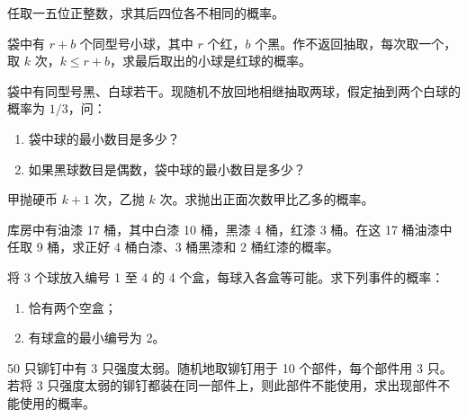 \begin{exercise}
任取一五位正整数，求其后四位各不相同的概率。
\end{exercise}

\begin{exercise}
袋中有 $r+b$ 个同型号小球，其中 $r$ 个红，$b$ 个黑。作不返回抽取，每次取一个，取 $k$ 次，$k \le r+b$，求最后取出的小球是红球的概率。
\end{exercise}
\begin{exercise}
袋中有同型号黑、白球若干。现随机不放回地相继抽取两球，假定抽到两个白球的概率为 $1/3$，问：
\begin{enumerate}
  \item 袋中球的最小数目是多少？
  \item 如果黑球数目是偶数，袋中球的最小数目是多少？
\end{enumerate}
\end{exercise}

\begin{exercise}
甲抛硬币 $k+1$ 次，乙抛 $k$ 次。求抛出正面次数甲比乙多的概率。
\end{exercise}

\begin{exercise}
库房中有油漆 17 桶，其中白漆 10 桶，黑漆 4 桶，红漆 3 桶。在这 17 桶油漆中任取 9 桶，求正好 4 桶白漆、3 桶黑漆和 2 桶红漆的概率。
\end{exercise}

\begin{exercise}
将 3 个球放入编号 1 至 4 的 4 个盒，每球入各盒等可能。求下列事件的概率：
\begin{enumerate}
  \item 恰有两个空盒；
  \item 有球盒的最小编号为 2。
\end{enumerate}
\end{exercise}

\begin{exercise}
50 只铆钉中有 3 只强度太弱。随机地取铆钉用于 10 个部件，每个部件用 3 只。若将 3 只强度太弱的铆钉都装在同一部件上，则此部件不能使用，求出现部件不能使用的概率。
\end{exercise}

